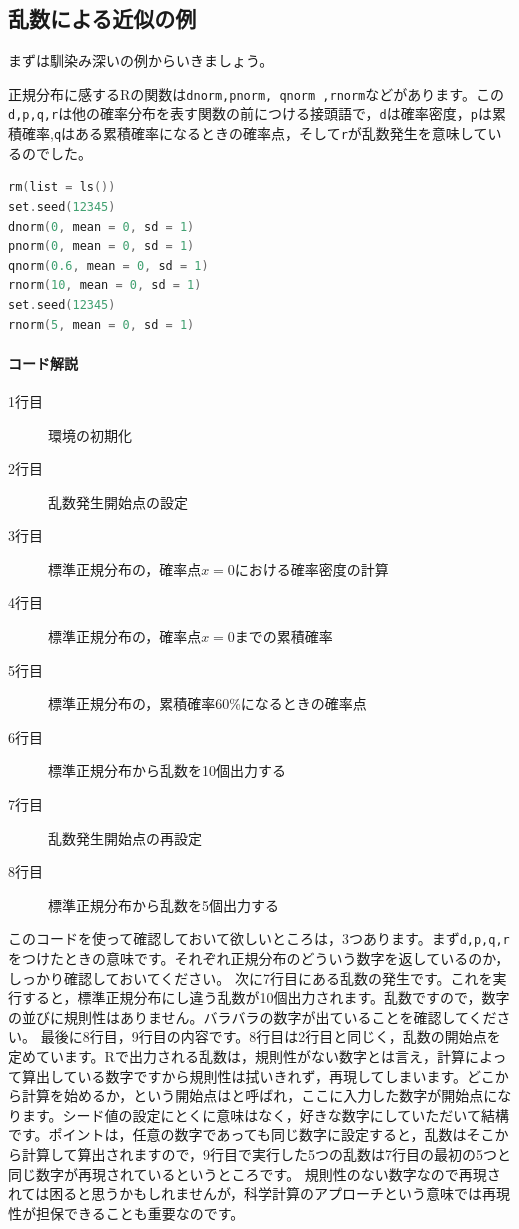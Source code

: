 \documentclass{ltjsbook}
\begin{document}
\subsection{乱数による近似の例}
まずは馴染み深いの例からいきましょう。

正規分布に感するRの関数は\texttt{dnorm,pnorm, qnorm ,rnorm}などがあります。この\texttt{d,p,q,r}は他の確率分布を表す関数の前につける接頭語で，\texttt{d}は確率密度，\texttt{p}は累積確率,\texttt{q}はある累積確率になるときの確率点，そして\texttt{r}が乱数発生を意味しているのでした。

\begin{lstlisting}[language=c++,label={code:17_01},caption={乱数のコードの例}]
rm(list = ls())
set.seed(12345)
dnorm(0, mean = 0, sd = 1)
pnorm(0, mean = 0, sd = 1)
qnorm(0.6, mean = 0, sd = 1)
rnorm(10, mean = 0, sd = 1)
set.seed(12345)
rnorm(5, mean = 0, sd = 1)
\end{lstlisting}
\paragraph{コード解説}
\begin{description}
  \item[1行目] 環境の初期化
  \item[2行目] 乱数発生開始点の設定
  \item[3行目] 標準正規分布の，確率点$x=0$における確率密度の計算
  \item[4行目] 標準正規分布の，確率点$x=0$までの累積確率
  \item[5行目] 標準正規分布の，累積確率60\%になるときの確率点
  \item[6行目] 標準正規分布から乱数を10個出力する
  \item[7行目] 乱数発生開始点の再設定
  \item[8行目] 標準正規分布から乱数を5個出力する
\end{description}

このコードを使って確認しておいて欲しいところは，3つあります。まず\texttt{d,p,q,r}をつけたときの意味です。それぞれ正規分布のどういう数字を返しているのか，しっかり確認しておいてください。
次に7行目にある乱数の発生です。これを実行すると，標準正規分布にし違う乱数が10個出力されます。乱数ですので，数字の並びに規則性はありません。バラバラの数字が出ていることを確認してください。
最後に8行目，9行目の内容です。8行目は2行目と同じく，乱数の開始点を定めています。Rで出力される乱数は，規則性がない数字とは言え，計算によって算出している数字ですから規則性は拭いきれず，再現してしまいます。どこから計算を始めるか，という開始点はと呼ばれ，ここに入力した数字が開始点になります。シード値の設定にとくに意味はなく，好きな数字にしていただいて結構です。ポイントは，任意の数字であっても同じ数字に設定すると，乱数はそこから計算して算出されますので，9行目で実行した5つの乱数は7行目の最初の5つと同じ数字が再現されているというところです。
規則性のない数字なので再現されては困ると思うかもしれませんが，科学計算のアプローチという意味では再現性が担保できることも重要なのです。
\end{document}
